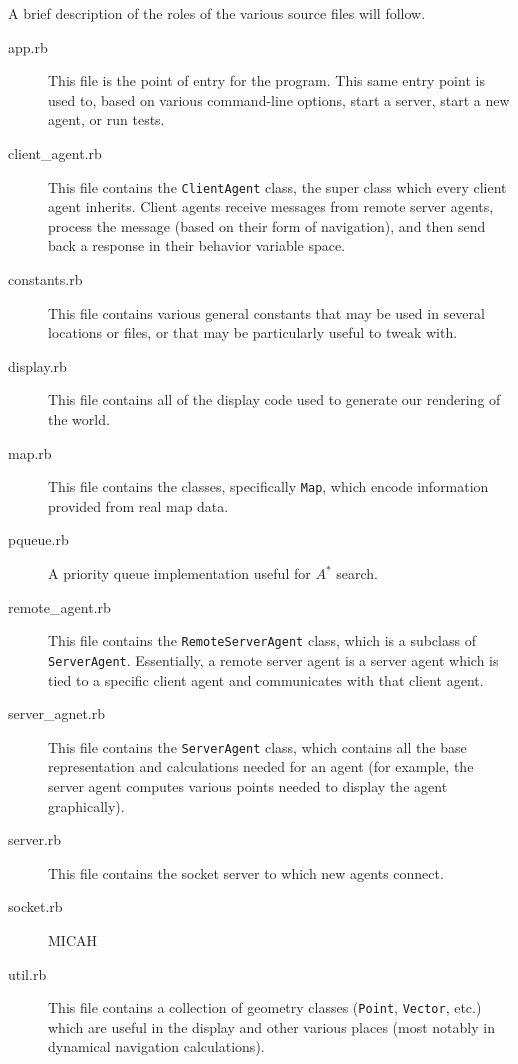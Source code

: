 \documentclass{article}
\newcommand{\code}{\texttt}
\begin{document}
A brief description of the roles of the various source files will follow.

\begin{description}
\item[app.rb] This file is the point of entry for the program. This same entry
  point is used to, based on various command-line options, start a server, start
  a new agent, or run tests.

\item[client\_agent.rb] This file contains the \code{ClientAgent} class, the
  super class which every client agent inherits. Client agents receive messages
  from remote server agents, process the message (based on their form of
  navigation), and then send back a response in their behavior variable space.

\item[constants.rb] This file contains various general constants that may be
  used in several locations or files, or that may be particularly useful to
  tweak with.

\item[display.rb] This file contains all of the display code used to generate
  our rendering of the world.

\item[map.rb] This file contains the classes, specifically \code{Map}, which
  encode information provided from real map data.

\item[pqueue.rb] A priority queue implementation useful for $A^*$ search.

\item[remote\_agent.rb] This file contains the \code{RemoteServerAgent} class,
  which is a subclass of \code{ServerAgent}. Essentially, a remote server agent
  is a server agent which is tied to a specific client agent and communicates
  with that client agent.

\item[server\_agnet.rb] This file contains the \code{ServerAgent} class, which
  contains all the base representation and calculations needed for an agent (for
  example, the server agent computes various points needed to display the agent
  graphically).

\item[server.rb] This file contains the socket server to which new agents
  connect.

\item[socket.rb] MICAH

\item[util.rb] This file contains a collection of geometry classes
  (\code{Point}, \code{Vector}, etc.) which are useful in the display and other
  various places (most notably in dynamical navigation calculations).


\end{description}
\end{document}
